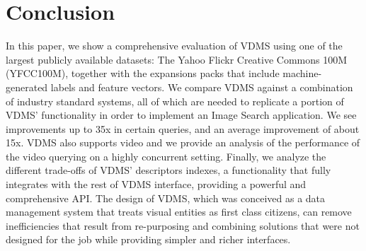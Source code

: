 \section{Conclusion}

In this paper, we show a comprehensive evaluation of VDMS 
using one of the largest publicly available datasets: 
The Yahoo Flickr Creative Commons 100M (YFCC100M), 
together with the expansions packs that include 
machine-generated labels and feature vectors.
We compare VDMS against a combination of industry standard systems, 
all of which are needed to replicate a portion of VDMS' 
functionality in order to implement an Image Search application. 
We see improvements up to 35x in certain queries, 
and an average improvement of about 15x. 
VDMS also supports video and 
we provide an analysis of the performance of the video querying
on a highly concurrent setting. 
Finally, we analyze the different trade-offs of VDMS' 
descriptors indexes, a functionality 
that fully integrates with the rest of VDMS interface, 
providing a powerful and comprehensive API.
The design of VDMS, which was conceived as a 
data management system that treats visual entities 
as first class citizens, can remove inefficiencies 
that result from re-purposing and combining solutions
that were not designed for the job while providing 
simpler and richer interfaces. 